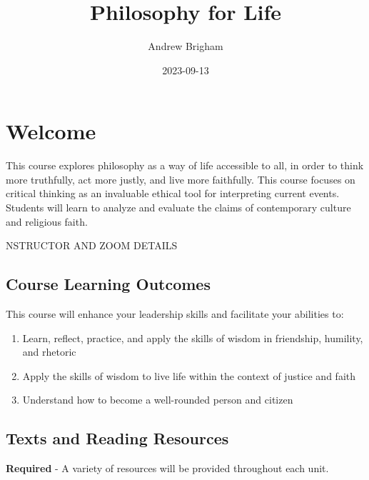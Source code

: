 \documentclass[
]{book}
\title{Philosophy for Life}
\author{Andrew Brigham}
\date{2023-09-13}
\providecommand{\tightlist}{%
  \setlength{\itemsep}{0pt}\setlength{\parskip}{0pt}}
\begin{document}
\maketitle

{
\setcounter{tocdepth}{1}
\tableofcontents
}
\hypertarget{welcome}{%
\chapter*{Welcome}\label{welcome}}

This course explores philosophy as a way of life accessible to all, in order to think more truthfully, act more justly, and live more faithfully. This course focuses on critical thinking as an invaluable ethical tool for interpreting current events. Students will learn to analyze and evaluate the claims of contemporary culture and religious faith.

NSTRUCTOR AND ZOOM DETAILS

\hypertarget{course-learning-outcomes}{%
\section*{Course Learning Outcomes}\label{course-learning-outcomes}}

This course will enhance your leadership skills and facilitate your abilities to:

\begin{enumerate}
\def\labelenumi{\arabic{enumi}.}
\tightlist
\item
  Learn, reflect, practice, and apply the skills of wisdom in friendship, humility, and rhetoric\\
\item
  Apply the skills of wisdom to live life within the context of justice and faith\\
\item
  Understand how to become a well-rounded person and citizen
\end{enumerate}

\hypertarget{texts-and-reading-resources}{%
\section*{Texts and Reading Resources}\label{texts-and-reading-resources}}

\textbf{Required}
- A variety of resources will be provided throughout each unit.
\end{document}
